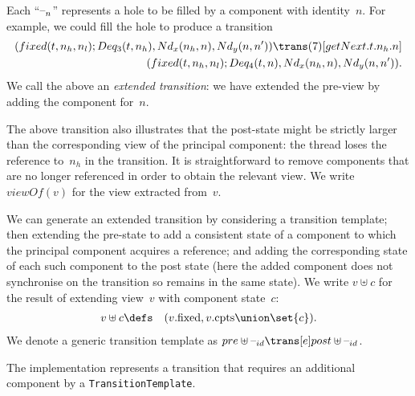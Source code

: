 Each ``$\mbox{--}_{n}$'' represents a hole to be filled by a component with
identity~$n$.  For example, we could fill the hole to produce a transition
\begin{equation}
\begin{align}
(fixed(t, n_h, n_l); Deq_3(t, n_h), \Node_x(n_h, n), \Node_y(n, n'))
  \trans(7)[getNext.t.n_h.n] \\
\qquad (fixed(t, n_h, n_l);   Deq_4(t, n), \Node_x(n_h, n), \Node_y(n, n')).
\label{trans:getNext}
\end{align}
\end{equation}
%
We call the above an \emph{extended transition}: we have extended the pre-view
by adding the component for~$n$.  

The above transition also illustrates that the post-state might be strictly
larger than the corresponding view of the principal component: the thread
loses the reference to~$n_h$ in the transition.  It is straightforward to
remove components that are no longer referenced in order to obtain the
relevant view.  We write $viewOf(v)$ for the view extracted from~$v$. 

We can generate an extended transition by considering a transition template;
then extending the pre-state to add a consistent state of a component to which
the principal component acquires a reference; and adding the corresponding
state of each such component to the post state (here the added component does
not synchronise on the transition so remains in the same state).  We write $v
\uplus c$ for the result of extending view~$v$ with component state~$c$:
\begin{eqnarray*}
v \uplus c & \defs & (v.\fixed, v.\cpts \union \set{c}).
\end{eqnarray*}
%
We denote a generic transition template as $pre \uplus \hole{id} \trans[e]
post \uplus \hole{id}$. 

\begin{impNote}
The implementation represents a transition that requires an
  additional component by a \texttt{TransitionTemplate}.
\end{impNote}

